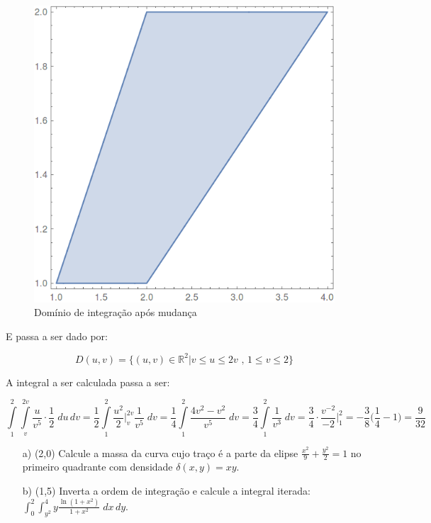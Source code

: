 \documentclass[12pt,a4paper]{article}
\newcommand{\re}{\mathbb{R}}
\begin{document}
\begin{itemize}
\begin{figure}[H]
	\centering
	\includegraphics[scale=0.25]{Fig1b-2.png}  
	\caption{Domínio de integração após mudança}
	\label{fig:figura1b2}
\end{figure}
E passa a ser dado por:

$$D(u,v)=\{(u,v)\in \re^2|v \leq u \leq 2v\,\,\mbox{,}\,\,1 \leq v \leq 2 \}$$

A integral a ser calculada passa a ser:

$$ \int\limits_1^2 \int\limits_v^{2v} \frac{u}{v^5} \cdot \frac{1}{2} \; du \, dv = \frac{1}{2} \int\limits_1^2  \frac{u^2}{2} \Big|_v^{2v} \frac{1}{v^5}  \; dv = \frac{1}{4} \int\limits_1^2  \frac{4v^2 - v^2}{v^5}  \; dv = \frac{3}{4} \int\limits_1^2  \frac{1}{v^3}  \; dv = \frac{3}{4} \cdot \frac{v^{-2}}{-2} \Big|_1^2 = -\frac{3}{8} \Big( \frac{1}{4} -1 \Big) = \frac{9}{32} $$

\end{itemize}

\newpage


\begin{itemize}
\item[a)] (2,0) Calcule a massa da curva cujo traço é a parte da elipse $\displaystyle\frac{x^2}{9} + \displaystyle\frac{y^2}{2} = 1 $ no primeiro quadrante com densidade $\delta(x,y) = xy$. \\
\item[b)] (1,5) Inverta a ordem de integração e calcule a integral iterada: $\displaystyle\int_0^2 \int_{y^2}^4 y \frac{\ln (1+x^2)}{1+x^2} \; dx \, dy$.
\end{itemize}
\end{document}
